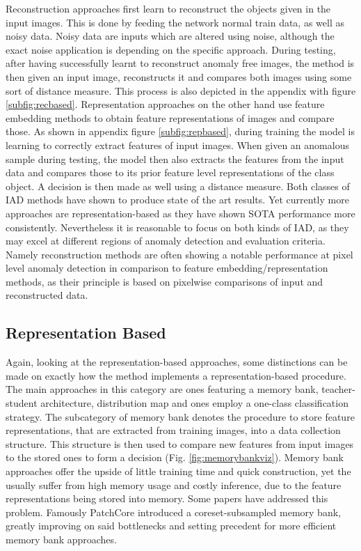 Reconstruction approaches first learn to reconstruct the objects given in the input images. This is done by feeding the network normal train data, as well as noisy data. Noisy data are inputs
which are altered using noise, although the exact noise application is depending on the specific approach. During testing, after having successfully learnt to 
reconstruct anomaly free images, the method is then given an input image, reconstructs it and compares both images using some sort of distance measure. This process is also depicted in the appendix with figure \ref{subfig:recbased}. 
Representation approaches on the other hand use feature embedding methods to obtain feature representations of images and compare those. As shown in appendix figure \ref{subfig:repbased}, during training the model is 
learning to correctly extract features of input images. When given an anomalous sample during testing, the model then also extracts the features from the input data and compares those to its 
prior feature level representations of the class object. A decision is then made as well using a distance measure.\newline
Both classes of IAD methods have shown to produce state of the art results. Yet currently more approaches are representation-based \cite{liu2024deep} as they have shown SOTA performance more 
consistently. Nevertheless it is reasonable to focus on both kinds of IAD, as they may excel at different regions of anomaly detection and evaluation criteria. Namely reconstruction methods are 
often showing a notable performance at pixel level anomaly detection in comparison to feature embedding/representation methods, as their principle is based on pixelwise comparisons of input 
and reconstructed data.

\subsection{Representation Based}

Again, looking at the representation-based approaches, some distinctions can be made on exactly how the method implements a representation-based procedure.
The main approaches in this category are ones featuring a memory bank, teacher-student architecture, distribution map and ones employ a one-class classification strategy. The subcategory of 
memory bank denotes the procedure to store feature representations, that are extracted from training images, into a data collection structure. This structure is then used to compare new 
features from input images to the stored ones to form a decision (Fig. \ref{fig:memorybankviz}). Memory bank approaches offer the upside of little training time and quick construction, yet the usually suffer from high memory 
usage and costly inference, due to the feature representations being stored into memory. Some papers have addressed this problem. Famously PatchCore \cite{patchCore2022} introduced a coreset-subsampled 
memory bank, greatly improving on said bottlenecks and setting precedent for more efficient memory bank approaches. \newline

